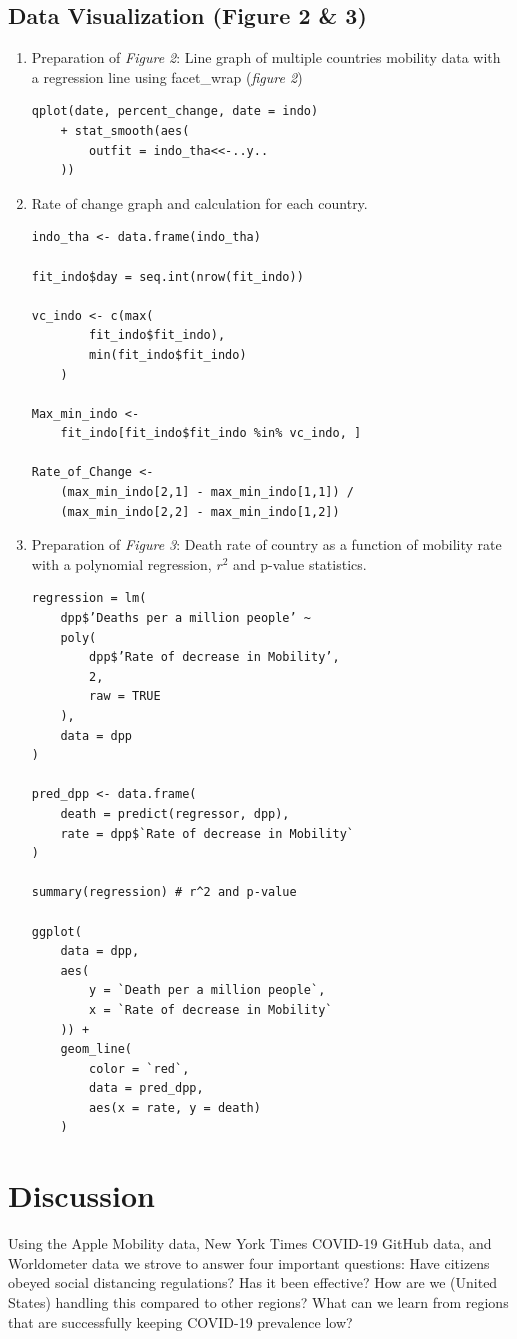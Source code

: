 \documentclass[11pt, english]{article}
\begin{document}
\subsection{Data Visualization (Figure 2 \& 3)}
\begin{enumerate}
    \item Preparation of \textit{Figure 2}: Line graph of multiple countries mobility data with a regression line using facet\_wrap (\textit{figure 2})
\begin{verbatim}
qplot(date, percent_change, date = indo)
    + stat_smooth(aes(
        outfit = indo_tha<<-..y..
    ))
\end{verbatim}
    \item Rate of change graph and calculation for each country.
\begin{verbatim}
indo_tha <- data.frame(indo_tha)

fit_indo$day = seq.int(nrow(fit_indo))

vc_indo <- c(max(
        fit_indo$fit_indo),
        min(fit_indo$fit_indo)
    )
    
Max_min_indo <-
    fit_indo[fit_indo$fit_indo %in% vc_indo, ]
    
Rate_of_Change <- 
    (max_min_indo[2,1] - max_min_indo[1,1]) /
    (max_min_indo[2,2] - max_min_indo[1,2])
\end{verbatim}
\newpage
    \item Preparation of \textit{Figure 3}: Death rate of country as a function of mobility rate with a polynomial regression,  $r^2$ and p-value statistics.
\begin{verbatim}
regression = lm(
    dpp$’Deaths per a million people’ ~
    poly(
        dpp$’Rate of decrease in Mobility’,
        2,
        raw = TRUE
    ),
    data = dpp
)

pred_dpp <- data.frame(
    death = predict(regressor, dpp),
    rate = dpp$`Rate of decrease in Mobility`
)

summary(regression) # r^2 and p-value

ggplot(
    data = dpp,
    aes(
        y = `Death per a million people`,
        x = `Rate of decrease in Mobility`
    )) + 
    geom_line(
        color = `red`,
        data = pred_dpp, 
        aes(x = rate, y = death)
    )
\end{verbatim}
\end{enumerate}
\clearpage
\section{Discussion}
Using the Apple Mobility data, New York Times COVID-19 GitHub data, and Worldometer data we strove to answer four important questions: Have citizens obeyed social distancing regulations? Has it been effective? How are we (United States) handling this compared to other regions? What can we learn from regions that are successfully keeping COVID-19 prevalence low?
\end{document}
